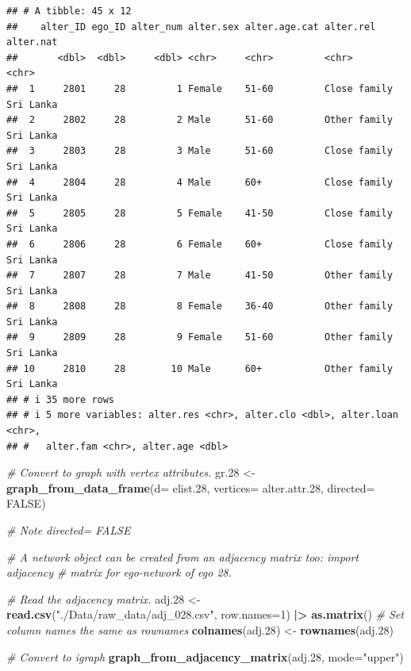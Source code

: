 \documentclass[
]{book}
\newenvironment{Shaded}{\begin{snugshade}}{\end{snugshade}}
\newcommand{\AttributeTok}[1]{\textcolor[rgb]{0.13,0.29,0.53}{#1}}
\newcommand{\CommentTok}[1]{\textcolor[rgb]{0.56,0.35,0.01}{\textit{#1}}}
\newcommand{\ConstantTok}[1]{\textcolor[rgb]{0.56,0.35,0.01}{#1}}
\newcommand{\DecValTok}[1]{\textcolor[rgb]{0.00,0.00,0.81}{#1}}
\newcommand{\FloatTok}[1]{\textcolor[rgb]{0.00,0.00,0.81}{#1}}
\newcommand{\FunctionTok}[1]{\textcolor[rgb]{0.13,0.29,0.53}{\textbf{#1}}}
\newcommand{\NormalTok}[1]{#1}
\newcommand{\OtherTok}[1]{\textcolor[rgb]{0.56,0.35,0.01}{#1}}
\newcommand{\SpecialCharTok}[1]{\textcolor[rgb]{0.81,0.36,0.00}{\textbf{#1}}}
\newcommand{\StringTok}[1]{\textcolor[rgb]{0.31,0.60,0.02}{#1}}
\begin{document}
\begin{verbatim}
## # A tibble: 45 x 12
##    alter_ID ego_ID alter_num alter.sex alter.age.cat alter.rel    alter.nat
##       <dbl>  <dbl>     <dbl> <chr>     <chr>         <chr>        <chr>    
##  1     2801     28         1 Female    51-60         Close family Sri Lanka
##  2     2802     28         2 Male      51-60         Other family Sri Lanka
##  3     2803     28         3 Male      51-60         Close family Sri Lanka
##  4     2804     28         4 Male      60+           Close family Sri Lanka
##  5     2805     28         5 Female    41-50         Close family Sri Lanka
##  6     2806     28         6 Female    60+           Close family Sri Lanka
##  7     2807     28         7 Male      41-50         Other family Sri Lanka
##  8     2808     28         8 Female    36-40         Other family Sri Lanka
##  9     2809     28         9 Female    51-60         Other family Sri Lanka
## 10     2810     28        10 Male      60+           Other family Sri Lanka
## # i 35 more rows
## # i 5 more variables: alter.res <chr>, alter.clo <dbl>, alter.loan <chr>,
## #   alter.fam <chr>, alter.age <dbl>
\end{verbatim}

\begin{Shaded}
\begin{Highlighting}[]
\CommentTok{\# Convert to graph with vertex attributes.}
\NormalTok{gr}\FloatTok{.28} \OtherTok{\textless{}{-}} \FunctionTok{graph\_from\_data\_frame}\NormalTok{(}\AttributeTok{d=}\NormalTok{ elist}\FloatTok{.28}\NormalTok{, }\AttributeTok{vertices=}\NormalTok{ alter.attr}\FloatTok{.28}\NormalTok{, }\AttributeTok{directed=} \ConstantTok{FALSE}\NormalTok{)}

\CommentTok{\# Note directed= FALSE}

\CommentTok{\# A network object can be created from an adjacency matrix too: import adjacency}
\CommentTok{\# matrix for ego{-}network of ego 28.}

\CommentTok{\# Read the adjacency matrix.}
\NormalTok{adj}\FloatTok{.28} \OtherTok{\textless{}{-}} \FunctionTok{read.csv}\NormalTok{(}\StringTok{"./Data/raw\_data/adj\_028.csv"}\NormalTok{, }\AttributeTok{row.names=}\DecValTok{1}\NormalTok{) }\SpecialCharTok{|\textgreater{}} 
  \FunctionTok{as.matrix}\NormalTok{()}
\CommentTok{\# Set column names the same as rownames}
\FunctionTok{colnames}\NormalTok{(adj}\FloatTok{.28}\NormalTok{) }\OtherTok{\textless{}{-}} \FunctionTok{rownames}\NormalTok{(adj}\FloatTok{.28}\NormalTok{)}

\CommentTok{\# Convert to igraph}
\FunctionTok{graph\_from\_adjacency\_matrix}\NormalTok{(adj}\FloatTok{.28}\NormalTok{, }\AttributeTok{mode=}\StringTok{"upper"}\NormalTok{)}
\end{Highlighting}
\end{Shaded}
\end{document}
